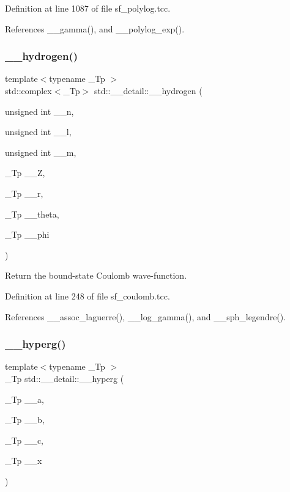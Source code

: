 Definition at line 1087 of file sf\+\_\+polylog.\+tcc.



References \+\_\+\+\_\+gamma(), and \+\_\+\+\_\+polylog\+\_\+exp().

\mbox{\label{namespacestd_1_1____detail_aba60bcf9f002dc900042065999546bc9}} 
\subsubsection{\texorpdfstring{\+\_\+\+\_\+hydrogen()}{\_\_hydrogen()}}
{\footnotesize\ttfamily template$<$typename \+\_\+\+Tp $>$ \\
std\+::complex$<$\+\_\+\+Tp$>$ std\+::\+\_\+\+\_\+detail\+::\+\_\+\+\_\+hydrogen (\begin{DoxyParamCaption}\item[{unsigned int}]{\+\_\+\+\_\+n,  }\item[{unsigned int}]{\+\_\+\+\_\+l,  }\item[{unsigned int}]{\+\_\+\+\_\+m,  }\item[{\+\_\+\+Tp}]{\+\_\+\+\_\+Z,  }\item[{\+\_\+\+Tp}]{\+\_\+\+\_\+r,  }\item[{\+\_\+\+Tp}]{\+\_\+\+\_\+theta,  }\item[{\+\_\+\+Tp}]{\+\_\+\+\_\+phi }\end{DoxyParamCaption})}

Return the bound-\/state Coulomb wave-\/function. 

Definition at line 248 of file sf\+\_\+coulomb.\+tcc.



References \+\_\+\+\_\+assoc\+\_\+laguerre(), \+\_\+\+\_\+log\+\_\+gamma(), and \+\_\+\+\_\+sph\+\_\+legendre().

\mbox{\label{namespacestd_1_1____detail_a316589a60d5e5f50201c2d42b980678c}} 
\subsubsection{\texorpdfstring{\+\_\+\+\_\+hyperg()}{\_\_hyperg()}}
{\footnotesize\ttfamily template$<$typename \+\_\+\+Tp $>$ \\
\+\_\+\+Tp std\+::\+\_\+\+\_\+detail\+::\+\_\+\+\_\+hyperg (\begin{DoxyParamCaption}\item[{\+\_\+\+Tp}]{\+\_\+\+\_\+a,  }\item[{\+\_\+\+Tp}]{\+\_\+\+\_\+b,  }\item[{\+\_\+\+Tp}]{\+\_\+\+\_\+c,  }\item[{\+\_\+\+Tp}]{\+\_\+\+\_\+x }\end{DoxyParamCaption})}



